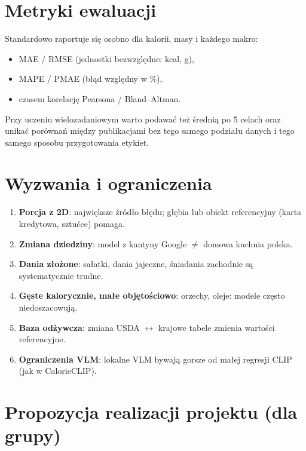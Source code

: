 \documentclass[11pt,a4paper]{article}
\begin{document}
\section{Metryki ewaluacji}

Standardowo raportuje się osobno dla kalorii, masy i każdego makro:
\begin{itemize}[leftmargin=*]
  \item MAE / RMSE (jednostki bezwzględne: kcal, g),
  \item MAPE / PMAE (błąd względny w \%),
  \item czasem korelację Pearsona / Bland--Altman.
\end{itemize}
Przy uczeniu wielozadaniowym warto podawać też średnią po 5 celach
oraz unikać porównań między publikacjami bez tego samego podziału danych
i tego samego sposobu przygotowania etykiet.

\section{Wyzwania i ograniczenia}

\begin{enumerate}[leftmargin=*]
  \item \textbf{Porcja z 2D}: największe źródło błędu; głębia lub obiekt referencyjny
        (karta kredytowa, sztućce) pomaga.
  \item \textbf{Zmiana dziedziny}: model z kantyny Google $\neq$ domowa kuchnia polska.
  \item \textbf{Dania złożone}: sałatki, dania jajeczne, śniadania zachodnie
        są systematycznie trudne.
  \item \textbf{Gęste kalorycznie, małe objętościowo}: orzechy, oleje:
        modele często niedoszacowują.
  \item \textbf{Baza odżywcza}: zmiana USDA $\leftrightarrow$ krajowe tabele
        zmienia wartości referencyjne.
  \item \textbf{Ograniczenia VLM}: lokalne VLM bywają gorsze od małej
        regresji CLIP (jak w CalorieCLIP).
\end{enumerate}

\section{Propozycja realizacji projektu (dla grupy)}
\end{document}
